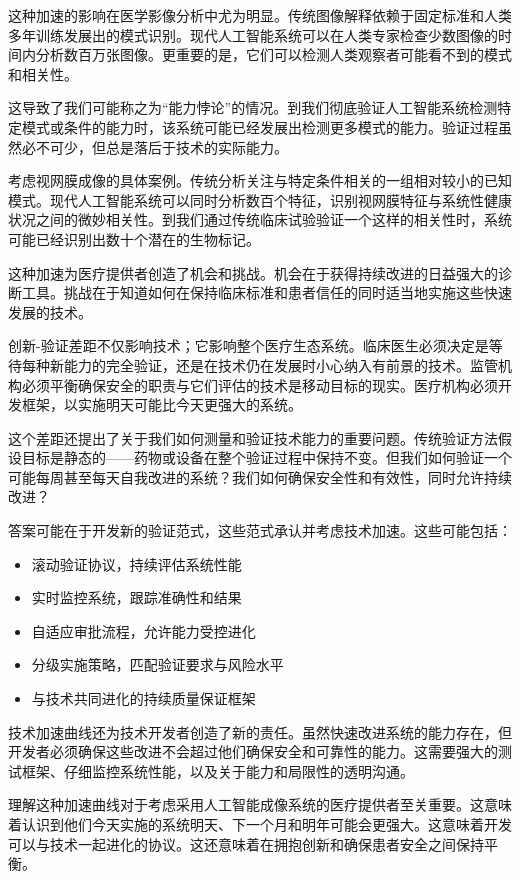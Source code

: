 \documentclass[
  Letterpaper,
]{scrbook}
\providecommand{\tightlist}{%
  \setlength{\itemsep}{0pt}\setlength{\parskip}{0pt}}\usepackage{longtable,booktabs,array}
\begin{document}
这种加速的影响在医学影像分析中尤为明显。传统图像解释依赖于固定标准和人类多年训练发展出的模式识别。现代人工智能系统可以在人类专家检查少数图像的时间内分析数百万张图像。更重要的是，它们可以检测人类观察者可能看不到的模式和相关性。

这导致了我们可能称之为``能力悖论''的情况。到我们彻底验证人工智能系统检测特定模式或条件的能力时，该系统可能已经发展出检测更多模式的能力。验证过程虽然必不可少，但总是落后于技术的实际能力。

考虑视网膜成像的具体案例。传统分析关注与特定条件相关的一组相对较小的已知模式。现代人工智能系统可以同时分析数百个特征，识别视网膜特征与系统性健康状况之间的微妙相关性。到我们通过传统临床试验验证一个这样的相关性时，系统可能已经识别出数十个潜在的生物标记。

这种加速为医疗提供者创造了机会和挑战。机会在于获得持续改进的日益强大的诊断工具。挑战在于知道如何在保持临床标准和患者信任的同时适当地实施这些快速发展的技术。

创新-验证差距不仅影响技术；它影响整个医疗生态系统。临床医生必须决定是等待每种新能力的完全验证，还是在技术仍在发展时小心纳入有前景的技术。监管机构必须平衡确保安全的职责与它们评估的技术是移动目标的现实。医疗机构必须开发框架，以实施明天可能比今天更强大的系统。

这个差距还提出了关于我们如何测量和验证技术能力的重要问题。传统验证方法假设目标是静态的------药物或设备在整个验证过程中保持不变。但我们如何验证一个可能每周甚至每天自我改进的系统？我们如何确保安全性和有效性，同时允许持续改进？

答案可能在于开发新的验证范式，这些范式承认并考虑技术加速。这些可能包括：

\begin{itemize}
\tightlist
\item
  滚动验证协议，持续评估系统性能
\item
  实时监控系统，跟踪准确性和结果
\item
  自适应审批流程，允许能力受控进化
\item
  分级实施策略，匹配验证要求与风险水平
\item
  与技术共同进化的持续质量保证框架
\end{itemize}

技术加速曲线还为技术开发者创造了新的责任。虽然快速改进系统的能力存在，但开发者必须确保这些改进不会超过他们确保安全和可靠性的能力。这需要强大的测试框架、仔细监控系统性能，以及关于能力和局限性的透明沟通。

理解这种加速曲线对于考虑采用人工智能成像系统的医疗提供者至关重要。这意味着认识到他们今天实施的系统明天、下一个月和明年可能会更强大。这意味着开发可以与技术一起进化的协议。这还意味着在拥抱创新和确保患者安全之间保持平衡。
\end{document}

